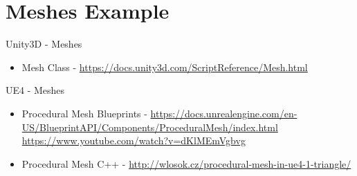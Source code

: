\part{Meshes Example}
\frame{\partpage}

\begin{frame}{Unity3D - Meshes}
	\begin{itemize}
		\item Mesh Class - \url{https://docs.unity3d.com/ScriptReference/Mesh.html}
	\end{itemize}
\end{frame}

\begin{frame}{UE4 - Meshes}
	\begin{itemize}
		\item Procedural Mesh Blueprints - \url{https://docs.unrealengine.com/en-US/BlueprintAPI/Components/ProceduralMesh/index.html}
		\url{https://www.youtube.com/watch?v=dKlMEmVgbvg}
		\item Procedural Mesh C++ -
		\url{http://wlosok.cz/procedural-mesh-in-ue4-1-triangle/}
	\end{itemize}
\end{frame}